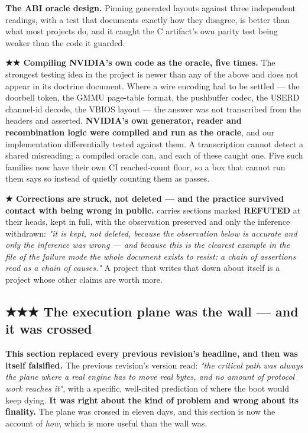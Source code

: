 \documentclass[10.5pt]{article}
\begin{document}
\textbf{The ABI oracle design.} Pinning generated layouts against three independent readings,
with a test that documents exactly how they disagree, is better than what most projects do, and
it caught the C artifact's own parity test being weaker than the code it guarded.

\textbf{★★ Compiling NVIDIA's own code as the oracle, five times.} The strongest testing idea in
the project is newer than any of the above and does not appear in its doctrine document. Where a
wire encoding had to be settled — the doorbell token, the GMMU page-table format, the pushbuffer
codec, the USERD channel-id decode, the VBIOS layout — the answer was not transcribed from the
headers and asserted. \textbf{NVIDIA's own generator, reader and recombination logic were
compiled and run as the oracle}, and our implementation differentially tested against them. A
transcription cannot detect a shared misreading; a compiled oracle can, and each of these caught
one. Five such families now have their own CI reached-count floor, so a box that cannot run them
says so instead of quietly counting them as passes.

\textbf{★ Corrections are struck, not deleted — and the practice survived contact with being
wrong in public.}  carries sections marked \textbf{REFUTED}
at their heads, kept in full, with the observation preserved and only the inference withdrawn:
\emph{"it is kept, not deleted, because the observation below is accurate and only the inference
was wrong — and because this is the clearest example in the file of the failure mode the whole
document exists to resist: a chain of assertions read as a chain of causes."} A project that
writes that down about itself is a project whose other claims are worth more.

\subsection{\texorpdfstring{★★★ The execution plane was the wall --- and it was crossed}{The execution plane was the wall --- and it was crossed}}
\label{sec:execplane}

\begin{claimbox}\small
\textbf{This section replaced every previous revision's headline, and then was itself falsified.}
The previous revision's version read: \emph{"the critical path was always the plane where a real
engine has to move real bytes, and no amount of protocol work reaches it"}, with a specific,
well-cited prediction of where the boot would keep dying. \textbf{It was right about the kind of
problem and wrong about its finality.} The plane was crossed in eleven days, and this section is
now the account of \emph{how}, which is more useful than the wall was.
\end{claimbox}
\end{document}
